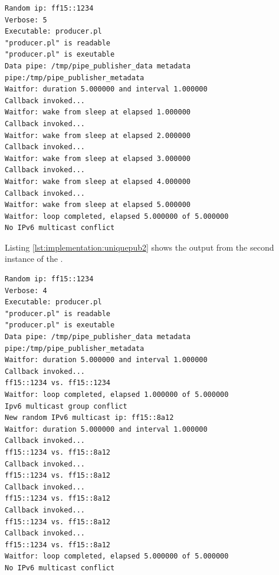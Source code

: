 \begin{lstlisting}
Random ip: ff15::1234
Verbose: 5
Executable: producer.pl
"producer.pl" is readable
"producer.pl" is exeutable
Data pipe: /tmp/pipe_publisher_data metadata pipe:/tmp/pipe_publisher_metadata
Waitfor: duration 5.000000 and interval 1.000000
Callback invoked...
Waitfor: wake from sleep at elapsed 1.000000
Callback invoked...
Waitfor: wake from sleep at elapsed 2.000000
Callback invoked...
Waitfor: wake from sleep at elapsed 3.000000
Callback invoked...
Waitfor: wake from sleep at elapsed 4.000000
Callback invoked...
Waitfor: wake from sleep at elapsed 5.000000
Waitfor: loop completed, elapsed 5.000000 of 5.000000
No IPv6 multicast conflict
\end{lstlisting} \label{lst:implementation:uniquepub1}

Listing \ref{lst:implementation:uniquepub2} shows the output from the second instance of the .

\begin{lstlisting}
Random ip: ff15::1234
Verbose: 4
Executable: producer.pl
"producer.pl" is readable
"producer.pl" is exeutable
Data pipe: /tmp/pipe_publisher_data metadata pipe:/tmp/pipe_publisher_metadata
Waitfor: duration 5.000000 and interval 1.000000
Callback invoked...
ff15::1234 vs. ff15::1234
Waitfor: loop completed, elapsed 1.000000 of 5.000000
Ipv6 multicast group conflict
New random IPv6 multicast ip: ff15::8a12
Waitfor: duration 5.000000 and interval 1.000000
Callback invoked...
ff15::1234 vs. ff15::8a12
Callback invoked...
ff15::1234 vs. ff15::8a12
Callback invoked...
ff15::1234 vs. ff15::8a12
Callback invoked...
ff15::1234 vs. ff15::8a12
Callback invoked...
ff15::1234 vs. ff15::8a12
Waitfor: loop completed, elapsed 5.000000 of 5.000000
No IPv6 multicast conflict
\end{lstlisting}\label{lst:implementation:uniquepub2}


